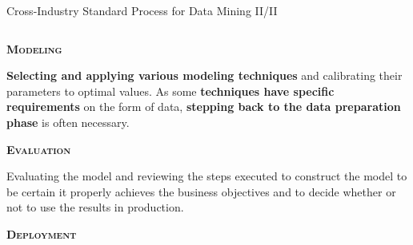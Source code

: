 \documentclass[main.tex]{subfiles}
\begin{document}
    \begin{frame}{Cross-Industry Standard Process for Data Mining II/II}
        \begin{columns}
            \begin{column}{.6\textwidth}
                \begin{justify}
                    \alert{\textbf{\textsc{Modeling}}}
                    
                    \textbf{Selecting and applying various modeling techniques} and calibrating their parameters to optimal values. As some \textbf{techniques have specific requirements} on the form of data, \textbf{stepping back to the data preparation phase} is often necessary.
                    \vspace*{2mm}
                    
                    \alert{\textbf{\textsc{Evaluation}}}
                    
                    Evaluating the model and reviewing the steps executed to construct the model to be certain it properly achieves the business objectives and to decide whether or not to use the results in production.                
                    \vspace*{2mm}
                    
                    \alert{\textbf{\textsc{Deployment}}}
                    

\end{justify}
\end{column}
\end{columns}
\end{frame}
\end{document}
